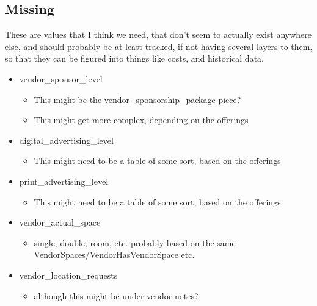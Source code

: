 \documentclass[captions=tablesignature]{scrartcl}
\begin{document}
\subsection{Missing}
\label{sec-2-3}
These are values that I think we need, that don't seem to actually
exist anywhere else, and should probably be at least tracked, if
not having several layers to them, so that they can be figured into
things like costs, and historical data.
\begin{itemize}
\item vendor\_sponsor\_level
\label{sec-2-3-1}
\begin{itemize}
\item This might be the vendor\_sponsorship\_package piece?
\item This might get more complex, depending on the offerings
\end{itemize}

\item digital\_advertising\_level
\label{sec-2-3-2}
\begin{itemize}
\item This might need to be a table of some sort, based on the
offerings
\end{itemize}

\item print\_advertising\_level
\label{sec-2-3-3}
\begin{itemize}
\item This might need to be a table of some sort, based on the
offerings
\end{itemize}

\item vendor\_actual\_space
\label{sec-2-3-4}
\begin{itemize}
\item single, double, room, etc. probably based on the same
VendorSpaces/VendorHasVendorSpace etc.
\end{itemize}

\item vendor\_location\_requests
\label{sec-2-3-5}
\begin{itemize}
\item although this might be under vendor notes?
\end{itemize}
\end{itemize}
\end{document}
